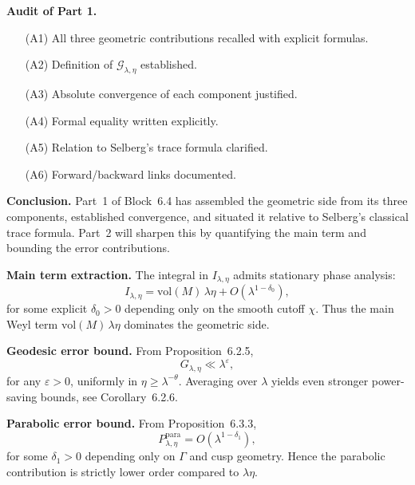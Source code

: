 \medskip

\noindent\textbf{Audit of Part 1.}
\begin{itemize}
  \item[(A1)] All three geometric contributions recalled with explicit formulas.
  \item[(A2)] Definition of $\mathcal{G}_{\lambda,\eta}$ established.
  \item[(A3)] Absolute convergence of each component justified.
  \item[(A4)] Formal equality written explicitly.
  \item[(A5)] Relation to Selberg’s trace formula clarified.
  \item[(A6)] Forward/backward links documented.
\end{itemize}

\medskip

\noindent\textbf{Conclusion.}
Part~1 of Block~6.4 has assembled the geometric side from its three components, established convergence, and situated it relative to Selberg’s classical trace formula.  
Part~2 will sharpen this by quantifying the main term and bounding the error contributions.



\noindent\textbf{Main term extraction.}
The integral in $I_{\lambda,\eta}$ admits stationary phase analysis:
\[
  I_{\lambda,\eta}
  = \mathrm{vol}(M)\, \lambda \eta
  + O(\lambda^{1-\delta_0}),
\]
for some explicit $\delta_0>0$ depending only on the smooth cutoff $\chi$.  
Thus the main Weyl term $\mathrm{vol}(M)\, \lambda\eta$ dominates the geometric side.

\medskip

\noindent\textbf{Geodesic error bound.}
From Proposition~6.2.5,
\[
  G_{\lambda,\eta} \ll \lambda^\varepsilon,
\]
for any $\varepsilon>0$, uniformly in $\eta\ge \lambda^{-\theta}$.  
Averaging over $\lambda$ yields even stronger power-saving bounds, see Corollary~6.2.6.

\medskip

\noindent\textbf{Parabolic error bound.}
From Proposition~6.3.3,
\[
  P_{\lambda,\eta}^{\mathrm{para}} = O(\lambda^{1-\delta_1}),
\]
for some $\delta_1>0$ depending only on $\Gamma$ and cusp geometry.  
Hence the parabolic contribution is strictly lower order compared to $\lambda\eta$.

\medskip

